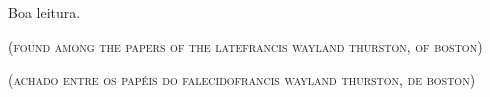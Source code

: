 Boa leitura.

\pagebreak
\thispagestyle{empty}
\begin{center}
\begin{vplace}[0.5]
\Large
{}\break\normalsize\textsc{(found among the papers of the late\break francis wayland thurston, of boston)}
\end{vplace}
\end{center}


\pagebreak
\thispagestyle{empty}
\begin{center}
\begin{vplace}[0.5]
\Large
{}\break\normalsize\textsc{(achado entre os papéis do falecido\break francis wayland thurston, de boston)}
\end{vplace}
\end{center}
